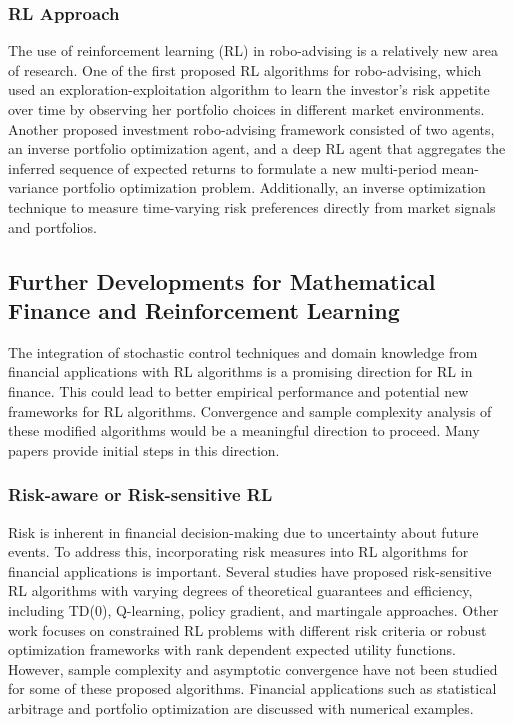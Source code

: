 \documentclass{article}
\begin{document}
\subsubsection{RL Approach}
The use of reinforcement learning (RL) in robo-advising is a relatively new area of research. One of the first proposed RL algorithms for robo-advising, which used an exploration-exploitation algorithm to learn the investor's risk appetite over time by observing her portfolio choices in different market environments. Another proposed investment robo-advising framework consisted of two agents, an inverse portfolio optimization agent, and a deep RL agent that aggregates the inferred sequence of expected returns to formulate a new multi-period mean-variance portfolio optimization problem. Additionally, an inverse optimization technique to measure time-varying risk preferences directly from market signals and portfolios.


\subsection{Further Developments for Mathematical Finance and Reinforcement Learning}
The integration of stochastic control techniques and domain knowledge from financial applications with RL algorithms is a promising direction for RL in finance. This could lead to better empirical performance and potential new frameworks for RL algorithms. Convergence and sample complexity analysis of these modified algorithms would be a meaningful direction to proceed. Many papers provide initial steps in this direction.

\subsubsection{Risk-aware or Risk-sensitive RL}
Risk is inherent in financial decision-making due to uncertainty about future events. To address this, incorporating risk measures into RL algorithms for financial applications is important. Several studies have proposed risk-sensitive RL algorithms with varying degrees of theoretical guarantees and efficiency, including TD(0), Q-learning, policy gradient, and martingale approaches. Other work focuses on constrained RL problems with different risk criteria or robust optimization frameworks with rank dependent expected utility functions. However, sample complexity and asymptotic convergence have not been studied for some of these proposed algorithms. Financial applications such as statistical arbitrage and portfolio optimization are discussed with numerical examples.
\end{document}
